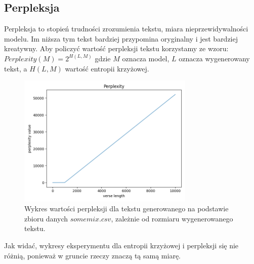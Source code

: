 \documentclass{article}
\begin{document}
\subsection{Perpleksja}
Perpleksja to stopień trudności zrozumienia tekstu, miara nieprzewidywalności modelu. Im niższa tym tekst bardziej przypomina oryginalny i jest bardziej kreatywny. Aby policzyć wartość perpleksji tekstu korzystamy ze wzoru: $Perplexity(M) = 2^{H(L,M)}$ gdzie $M$ oznacza model, $L$ oznacza wygenerowany tekst, a $H(L, M)$ wartość entropii krzyżowej.
\begin{figure}[h]
    \centering
    \includegraphics[width=0.75\textwidth]{perplexity}
    \caption{Wykres wartości perpleksji dla tekstu generowanego na podstawie zbioru danych $somemix.csv$, zależnie od rozmiaru wygenerowanego tekstu.}
    \label{fig:mesh1}
\end{figure}
\FloatBarrier
Jak widać, wykresy eksperymentu dla entropii krzyżowej i perpleksji się nie różnią, ponieważ w gruncie rzeczy znaczą tą samą miarę.
\end{document}
